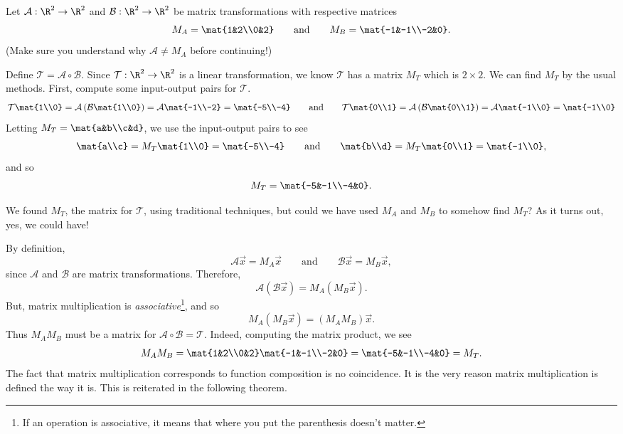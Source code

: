 Let $\mathcal A:\R^2\to\R^2$ and $\mathcal B:\R^2\to\R^2$ be matrix transformations with respective matrices
\[
	M_A=\mat{1&2\\0&2}\qquad\text{and}\qquad M_B=\mat{-1&-1\\-2&0}.
\]
(Make sure you understand why $\mathcal A\neq M_A$ before continuing!)


Define $\mathcal T=\mathcal A\circ \mathcal B$. Since $\mathcal T:\R^2\to\R^2$ is a linear transformation, 
we know $\mathcal T$ has a matrix $M_T$ which is $2\times 2$. We can
find $M_T$ by the usual methods. First, compute some input-output pairs for $\mathcal T$.
\[
	\mathcal T\mat{1\\0} = \mathcal A\left( \mathcal B\mat{1\\0}\right) = \mathcal A\mat{-1\\-2}=\mat{-5\\-4}
	\qquad\text{and}\qquad
	\mathcal T\mat{0\\1} = \mathcal A\left( \mathcal B\mat{0\\1}\right) = \mathcal A\mat{-1\\0}=\mat{-1\\0}
\]
Letting $M_T=\mat{a&b\\c&d}$, we use the input-output pairs to see
\[
	\mat{a\\c}=M_T\mat{1\\0}=\mat{-5\\-4}\qquad \text{and}\qquad \mat{b\\d}=M_T\mat{0\\1}=\mat{-1\\0},
\]
and so
\[
	M_T=\mat{-5&-1\\-4&0}.
\]

We found $M_T$, the matrix for $\mathcal T$, using traditional techniques, but could we have used $M_A$ and $M_B$ to somehow find $M_T$?
As it turns out, yes, we could have!

By definition,
\[
	\mathcal A\vec x=M_A\vec x\qquad\text{and}\qquad \mathcal B\vec x=M_B\vec x,
\]
since $\mathcal A$ and $\mathcal B$ are matrix transformations. Therefore,
\[
	\mathcal A(\mathcal B\vec x) = M_A(M_B\vec x).
\]
But, matrix multiplication is \emph{associative}\footnote{ If an operation is associative, it means
that where you put the parenthesis doesn't matter.}, and so
\[
	M_A(M_B\vec x)=(M_AM_B)\vec x.
\]
Thus $M_AM_B$ must be a matrix for $\mathcal A\circ \mathcal B=\mathcal T$. Indeed, computing the matrix product, we see
\[
	M_AM_B=\mat{1&2\\0&2}\mat{-1&-1\\-2&0}=\mat{-5&-1\\-4&0}=M_T.
\]
The fact that matrix multiplication corresponds to function composition is no coincidence. It is the very
reason matrix multiplication is defined the way it is. This is reiterated in the following theorem.

